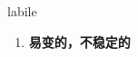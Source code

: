 
\begin{frame}
{\huge labile}
\begin{center}
\begin{enumerate}\Large
  \item \textbf{易变的，不稳定的}
\end{enumerate}
\end{center}
\end{frame}
